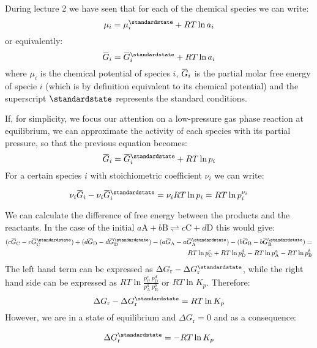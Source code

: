 \documentclass[12pt,a4paper]{report}
\newcommand{\overbar}[1]{\mkern 1.5mu\overline{\mkern-1.5mu#1\mkern-1.5mu}\mkern 1.5mu}
\newif\ifstudents
\begin{document}
   During lecture 2 we have seen that for each of the chemical species we can write:
   \begin{equation*}
   \mu_{i}=\mu_{i}^{\standardstate}+RT \ln a_{i}
   \end{equation*}
   or equivalently:
   \begin{equation*}
   \overbar{G}_{i}=\overbar{G}_{i}^{\standardstate}+RT \ln a_{i}
   \end{equation*}
   where $\mu_{i}$ is the chemical potential of species $i$, $\overbar{G}_{i}$ is the partial molar free energy of specie $i$ (which is by definition equivalent to its chemical potential) and the superscript $\standardstate$ represents the standard conditions.
   
   If, for simplicity, we focus our attention on a low-pressure gas phase reaction at equilibrium, we can approximate the activity of each species with its partial pressure, so that the previous equation becomes:
   \begin{equation*}
   \overbar{G}_{i}=\overbar{G}_{i}^{\standardstate}+RT \ln p_{i}
   \end{equation*}
   For a certain species $i$ with stoichiometric coefficient $\nu_{i}$ we can write:
   \ifstudents \hideit[2]{ \fi
   \begin{equation*}
   \nu_{i}\overbar{G}_{i}-\nu_{i}\overbar{G}_{i}^{\standardstate}=\nu_{i}RT \ln p_{i} = RT \ln p_{i}^{\nu_{i}} 
   \end{equation*}
   \ifstudents } \fi
   We can calculate the difference of free energy between the products and the reactants. In the case of the initial $a\mathrm{A}+b\mathrm{B} \rightleftharpoons c\mathrm{C}+d\mathrm{D}$ this would give:
   \begin{align*}
   (c\overbar{G}_{\mathrm{C}}-c\overbar{G}^{\standardstate}_{\mathrm{C}})+(d\overbar{G}_{\mathrm{D}}-d\overbar{G}^{\standardstate}_{\mathrm{D}})-(a\overbar{G}_{\mathrm{A}}-a\overbar{G}^{\standardstate}_{\mathrm{A}})-(b\overbar{G}_{\mathrm{B}}-b\overbar{G}^{\standardstate}_{\mathrm{B}}) =\\ RT\ln p_{\mathrm{C}}^{c}+RT\ln p_{\mathrm{D}}^{d}-RT\ln p_{\mathrm{A}}^{a}-RT\ln p_{\mathrm{B}}^{b}
   \end{align*}
   The left hand term can be expressed as $\Delta G_{\mathrm{r}}-\Delta G^{\standardstate}_{\mathrm{r}}$, while the right hand side can be expressed as $RT\ln \frac{p_{\mathrm{C}}^{c}\ p_{\mathrm{D}}^{d}}{p_{\mathrm{A}}^{a}\  p_{\mathrm{B}}^{b}}$ or $RT \ln K_{p}$.
   Therefore:
   \begin{equation*}
   \Delta G_{\mathrm{r}}-\Delta G^{\standardstate}_{\mathrm{r}}=RT \ln K_{p}
   \end{equation*}
   However, we are in a state of equilibrium and $\Delta G_{\mathrm{r}} = 0$ and as a consequence:
   \ifstudents \hideit[2]{ \fi
   \begin{equation*}
   \Delta G^{\standardstate}_{\mathrm{r}}=-RT \ln K_{p}
   \end{equation*}   
   \ifstudents } \fi
   
\end{document}
